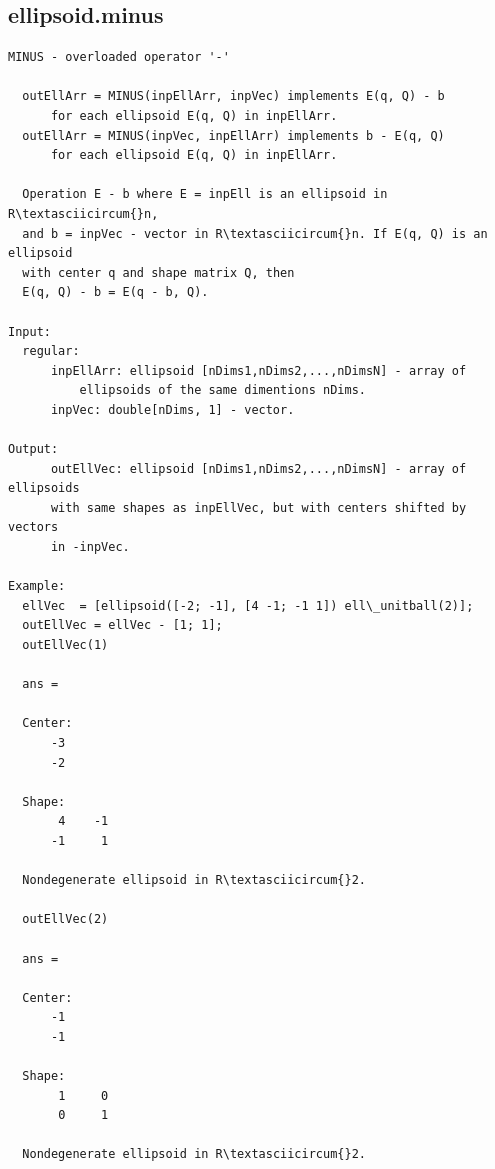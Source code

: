 \documentclass[letterpaper,10pt,english]{sphinxmanual}
\begin{document}
\subsection{ellipsoid.minus}
\label{chap_functions:ellipsoid-minus}
\begin{Verbatim}[commandchars=\\\{\}]
MINUS - overloaded operator '-'

  outEllArr = MINUS(inpEllArr, inpVec) implements E(q, Q) - b
      for each ellipsoid E(q, Q) in inpEllArr.
  outEllArr = MINUS(inpVec, inpEllArr) implements b - E(q, Q)
      for each ellipsoid E(q, Q) in inpEllArr.

  Operation E - b where E = inpEll is an ellipsoid in R\textasciicircum{}n,
  and b = inpVec - vector in R\textasciicircum{}n. If E(q, Q) is an ellipsoid
  with center q and shape matrix Q, then
  E(q, Q) - b = E(q - b, Q).

Input:
  regular:
      inpEllArr: ellipsoid [nDims1,nDims2,...,nDimsN] - array of
          ellipsoids of the same dimentions nDims.
      inpVec: double[nDims, 1] - vector.

Output:
      outEllVec: ellipsoid [nDims1,nDims2,...,nDimsN] - array of ellipsoids
      with same shapes as inpEllVec, but with centers shifted by vectors
      in -inpVec.

Example:
  ellVec  = [ellipsoid([-2; -1], [4 -1; -1 1]) ell\_unitball(2)];
  outEllVec = ellVec - [1; 1];
  outEllVec(1)

  ans =

  Center:
      -3
      -2

  Shape:
       4    -1
      -1     1

  Nondegenerate ellipsoid in R\textasciicircum{}2.

  outEllVec(2)

  ans =

  Center:
      -1
      -1

  Shape:
       1     0
       0     1

  Nondegenerate ellipsoid in R\textasciicircum{}2.
\end{Verbatim}
\end{document}
